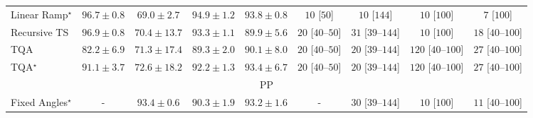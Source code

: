 \begin{tabular}{l|cccc|cccc|}
Linear Ramp$^\star$ & {\cellcolor[HTML]{712806}} \color[HTML]{F1F1F1} $96.7\pm 0.8$ & {\cellcolor[HTML]{FEC652}} \color[HTML]{000000} $69.0\pm 2.7$ & {\cellcolor[HTML]{812D05}} \color[HTML]{F1F1F1} $94.9\pm 1.2$ & {\cellcolor[HTML]{8B3005}} \color[HTML]{F1F1F1} $93.8\pm 0.8$ & {\cellcolor[HTML]{FFF7F3}} \color[HTML]{000000} $10$ [$50$] & {\cellcolor[HTML]{FFF7F3}} \color[HTML]{000000} $10$ [$144$] & {\cellcolor[HTML]{FFF7F3}} \color[HTML]{000000} $10$ [$100$] & {\cellcolor[HTML]{FFF7F3}} \color[HTML]{000000} $7$ [$100$] \\
Recursive TS & {\cellcolor[HTML]{702806}} \color[HTML]{F1F1F1} $96.9\pm 0.8$ & {\cellcolor[HTML]{FEBB47}} \color[HTML]{000000} $70.4\pm 13.7$ & {\cellcolor[HTML]{903104}} \color[HTML]{F1F1F1} $93.3\pm 1.1$ & {\cellcolor[HTML]{AC3D03}} \color[HTML]{F1F1F1} $89.9\pm 5.6$ & {\cellcolor[HTML]{FFF4F0}} \color[HTML]{000000} $20$ [$40$--$50$] & {\cellcolor[HTML]{FFF2EE}} \color[HTML]{000000} $31$ [$39$--$144$] & {\cellcolor[HTML]{FFF7F3}} \color[HTML]{000000} $10$ [$100$] & {\cellcolor[HTML]{FFF5F1}} \color[HTML]{000000} $18$ [$40$--$100$] \\
TQA & {\cellcolor[HTML]{E3660F}} \color[HTML]{F1F1F1} $82.2\pm 6.9$ & {\cellcolor[HTML]{FEB541}} \color[HTML]{000000} $71.3\pm 17.4$ & {\cellcolor[HTML]{B34003}} \color[HTML]{F1F1F1} $89.3\pm 2.0$ & {\cellcolor[HTML]{AB3C03}} \color[HTML]{F1F1F1} $90.1\pm 8.0$ & {\cellcolor[HTML]{FFF4F0}} \color[HTML]{000000} $20$ [$40$--$50$] & {\cellcolor[HTML]{FFF4F0}} \color[HTML]{000000} $20$ [$39$--$144$] & {\cellcolor[HTML]{FDDCD8}} \color[HTML]{000000} $120$ [$40$--$100$] & {\cellcolor[HTML]{FFF3EF}} \color[HTML]{000000} $27$ [$40$--$100$] \\
TQA$^\star$ & {\cellcolor[HTML]{A33904}} \color[HTML]{F1F1F1} $91.1\pm 3.7$ & {\cellcolor[HTML]{FEAB39}} \color[HTML]{000000} $72.6\pm 18.2$ & {\cellcolor[HTML]{993404}} \color[HTML]{F1F1F1} $92.2\pm 1.3$ & {\cellcolor[HTML]{8E3104}} \color[HTML]{F1F1F1} $93.4\pm 6.7$ & {\cellcolor[HTML]{FFF4F0}} \color[HTML]{000000} $20$ [$40$--$50$] & {\cellcolor[HTML]{FFF4F0}} \color[HTML]{000000} $20$ [$39$--$144$] & {\cellcolor[HTML]{FDDCD8}} \color[HTML]{000000} $120$ [$40$--$100$] & {\cellcolor[HTML]{FFF3EF}} \color[HTML]{000000} $27$ [$40$--$100$] \\
\cline{1-9}
\multicolumn{9}{c}{\rule{0pt}{8pt}PP} \\
\midrule
Fixed Angles$^\star$ & {\cellcolor[HTML]{000000}} \color[HTML]{F1F1F1} {\cellcolor{white}} \color{black} - & {\cellcolor[HTML]{006034}} \color[HTML]{F1F1F1} $93.4\pm 0.6$ & {\cellcolor[HTML]{0B713B}} \color[HTML]{F1F1F1} $90.3\pm 1.9$ & {\cellcolor[HTML]{006234}} \color[HTML]{F1F1F1} $93.2\pm 1.6$ & {\cellcolor[HTML]{000000}} \color[HTML]{F1F1F1} {\cellcolor{white}} \color{black} - & {\cellcolor[HTML]{FFF2EE}} \color[HTML]{000000} $30$ [$39$--$144$] & {\cellcolor[HTML]{FFF7F3}} \color[HTML]{000000} $10$ [$100$] & {\cellcolor[HTML]{FFF6F2}} \color[HTML]{000000} $11$ [$40$--$100$] \\

\end{tabular}
